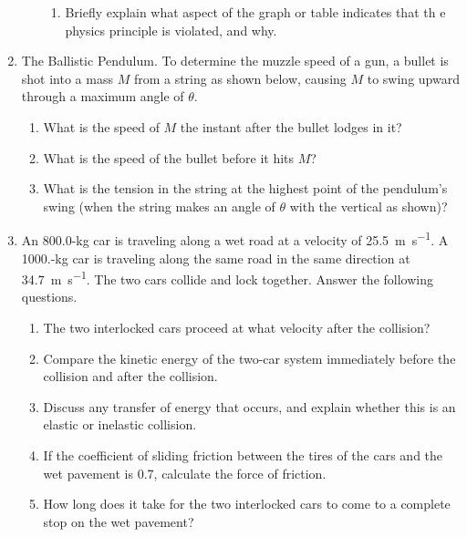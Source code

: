 \documentclass{../../../oss-apphys}
\begin{document}
\begin{enumerate}[leftmargin=15pt]
\begin{enumerate}[leftmargin=18pt,noitemsep]
\begin{enumerate}[leftmargin=18pt,noitemsep]
    \item Briefly explain what aspect of the graph or table indicates that th
      e physics principle is violated, and why.
    \end{enumerate}
  \end{enumerate}
  \newpage
  
\item The Ballistic Pendulum. To determine the muzzle speed of a gun, a bullet
  is shot into a mass $M$ from a string as shown below, causing $M$ to swing
  upward through a maximum angle of $\theta$.
  \begin{center}
  \end{center}
  \begin{enumerate}[noitemsep]
  \item What is the speed of $M$ the instant after the bullet lodges in it?
    \vspace{1.25in}
  \item What is the speed of the bullet before it hits $M$?
    \vspace{1.25in}
  \item What is the tension in the string at the highest point of the pendulum's
    swing (when the string makes an angle of $\theta$ with the vertical as
    shown)?
  \end{enumerate}
  \newpage
  
\item An 800.0-kg car is traveling along a wet road at a velocity of
  \SI{25.5}{\metre\per\second}. A \num{1000.}-kg car is traveling along the
  same road in the same direction at \SI{34.7}{\metre\per\second}. The two cars
  collide and lock together. Answer the following questions.
  \begin{enumerate}[leftmargin=18pt]
  \item The two interlocked cars proceed at what velocity after the collision?
  \item Compare the kinetic energy of the two-car system immediately before
    the collision and after the collision.
  \item Discuss any transfer of energy that occurs, and explain whether this is
    an elastic or inelastic collision.
  \item If the coefficient of sliding friction between the tires of the cars
    and the wet pavement is 0.7, calculate the force of friction.
  \item  How long does it take for the two interlocked cars to come to a
    complete stop on the wet pavement?
  \end{enumerate}
  \newpage
  

\end{enumerate}
\end{document}
